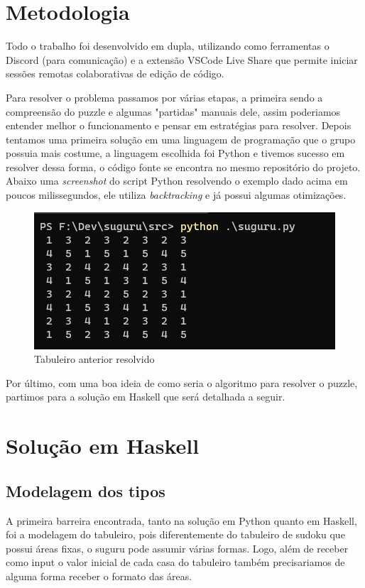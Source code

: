 \documentclass[12pt]{article}
\begin{document}
\section{Metodologia}

Todo o trabalho foi desenvolvido em dupla, utilizando como ferramentas o Discord (para comunicação) e a extensão VSCode Live Share que permite iniciar sessões remotas colaborativas de edição de código. 

Para resolver o problema passamos por várias etapas, a primeira sendo a compreensão do puzzle e algumas "partidas" manuais dele, assim poderiamos entender melhor o funcionamento e pensar em estratégias para resolver. Depois tentamos uma primeira solução em uma linguagem de programação que o grupo possuia mais costume, a linguagem escolhida foi Python e tivemos sucesso em resolver dessa forma, o código fonte se encontra no mesmo repositório do projeto. Abaixo uma \emph{screenshot} do script Python resolvendo o exemplo dado acima em poucos milissegundos, ele utiliza \emph{backtracking} e já possui algumas otimizações.

\begin{figure}[H]
    \centering
    \includegraphics[width=0.75\linewidth]{python_solver.png}
    \caption{Tabuleiro anterior resolvido}
\end{figure}

Por último, com uma boa ideia de como seria o algoritmo para resolver o puzzle, partimos para a solução em Haskell que será detalhada a seguir.

\section{Solução em Haskell}

\subsection{Modelagem dos tipos}

A primeira barreira encontrada, tanto na solução em Python quanto em Haskell, foi a modelagem do tabuleiro, pois diferentemente do tabuleiro de sudoku que possui áreas fixas, o suguru pode assumir várias formas. Logo, além de receber como input o valor inicial de cada casa do tabuleiro também precisariamos de alguma forma receber o formato das áreas. 
\end{document}
